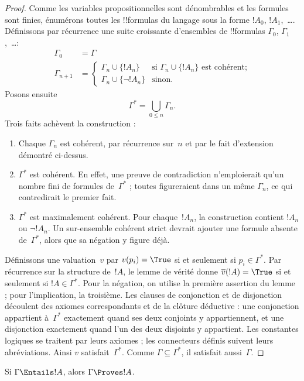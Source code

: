 \documentclass[../../../include/open-logic-section]{subfiles}
\begin{document}
\begin{proof}
Comme les variables propositionnelles sont dénombrables
et les formules sont finies, énumérons toutes les
!!{formula}s du langage sous la forme
$!A_0$, $!A_1$,~\dots.
Définissons par récurrence une suite croissante
d'ensembles de !!{formula}s
$\Gamma_0$, $\Gamma_1$,~\dots :
\begin{align*}
\Gamma_0 & = \Gamma\\
\Gamma_{n+1} & =
\begin{cases}
  \Gamma_n \cup \{!A_n\}
    & \text{si $\Gamma_n\cup\{!A_n\}$ est cohérent;}\\
  \Gamma_n \cup \{\lnot !A_n\}
    & \text{sinon.}
\end{cases}
\end{align*}
Posons ensuite
\[
\Gamma^*=\bigcup_{0\le n}\Gamma_n.
\]
Trois faits achèvent la construction :
\begin{enumerate}
\item Chaque $\Gamma_n$ est cohérent, par récurrence
  sur~$n$ et par le fait d'extension démontré ci-dessus.
\item $\Gamma^*$ est cohérent. En effet, une preuve de
  contradiction n'emploierait qu'un nombre fini
  de formules de~$\Gamma^*$ ; toutes figureraient
  dans un même $\Gamma_n$, ce qui contredirait
  le premier fait.
\item $\Gamma^*$ est maximalement cohérent.
  Pour chaque~$!A_n$, la construction contient
  $!A_n$ ou $\lnot !A_n$. Un sur-ensemble
  cohérent strict devrait ajouter une formule
  absente de~$\Gamma^*$, alors que sa négation
  y figure déjà.
\end{enumerate}
Définissons une valuation~$v$ par
$v(p_i)=\True$ si et seulement si
$p_i\in\Gamma^*$. Par récurrence sur la
structure de~$!A$, le lemme de vérité donne
$\overline v(!A)=\True$ si et seulement si
$!A\in\Gamma^*$. Pour la négation, on utilise
la première assertion du lemme ; pour l'implication,
la troisième. Les clauses de conjonction et de
disjonction découlent des axiomes correspondants
  et de la clôture déductive : une conjonction appartient
à~$\Gamma^*$ exactement quand ses deux conjoints
y appartiennent, et une disjonction exactement
quand l'un des deux disjoints y appartient.
Les constantes logiques se traitent par leurs
axiomes ; les connecteurs définis suivent leurs
abréviations. Ainsi $v$ satisfait~$\Gamma^*$.
Comme $\Gamma\subseteq\Gamma^*$, il satisfait
aussi~$\Gamma$.
\end{proof}

\begin{cor}
Si $\Gamma\Entails !A$, alors $\Gamma\Proves !A$.
\end{cor}
\end{document}

